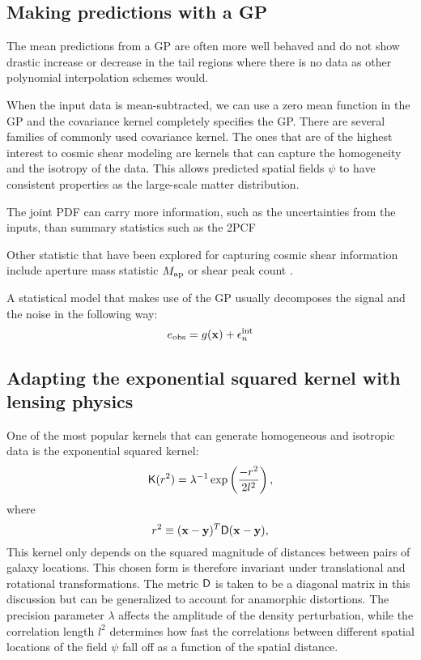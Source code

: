 \subsection{Making predictions with a GP}
The mean predictions from a GP are
often more well behaved and do not show drastic increase or decrease 
in the tail regions where there is no data as other polynomial interpolation schemes 
would.  





When the input data is mean-subtracted, we can use a zero mean function in the
GP and the covariance kernel completely specifies the GP. 
There are several families of commonly used covariance kernel.
The ones that are of the highest interest to cosmic shear modeling 
are kernels that can capture 
the homogeneity and the isotropy of the data. This allows predicted spatial fields
$\psi$ to have consistent properties as the large-scale matter distribution.

The joint PDF can carry more information,
such as the uncertainties from the inputs, 
than summary statistics such as the 2PCF  



Other statistic that have been explored for capturing cosmic shear information
include aperture mass statistic $M_{\rm ap}$ or shear peak count \citep{Bard2014}.

A statistical model that makes use of the GP usually decomposes 
the signal and the noise in the following way: 
\begin{equation}
	e_{\rm obs} = g(\mathbf{x}) + \epsilon_n^{\rm int}  
\end{equation}



\subsection{Adapting the exponential squared kernel with lensing physics}
One of the most popular kernels that can generate homogeneous and
isotropic data is the exponential squared kernel: 
\begin{equation}
	\mathsf{K}(r^2) = \lambda^{-1} \exp\left(\frac{-r^2}{2 l^2}\right),
	\label{eq:exp_sq_kernel}
\end{equation}
where 
\begin{equation}
	r^2 \equiv (\mathbf{x} - \mathbf{y})^T \mathsf{D} (\mathbf{x} - \mathbf{y}), 
\end{equation}
This kernel only depends on the
squared magnitude of distances between pairs of galaxy locations. 
This chosen form is therefore invariant
under translational and rotational transformations.
The metric $\mathsf{D}$ is taken to be a diagonal matrix in this discussion but  
can be generalized to account for anamorphic distortions. 
The precision parameter $\lambda$ affects the 
amplitude of the density perturbation, while the correlation length $l^2$ 
determines how fast the correlations between different spatial locations of the
field $\psi$ fall off as a function of the spatial distance.

